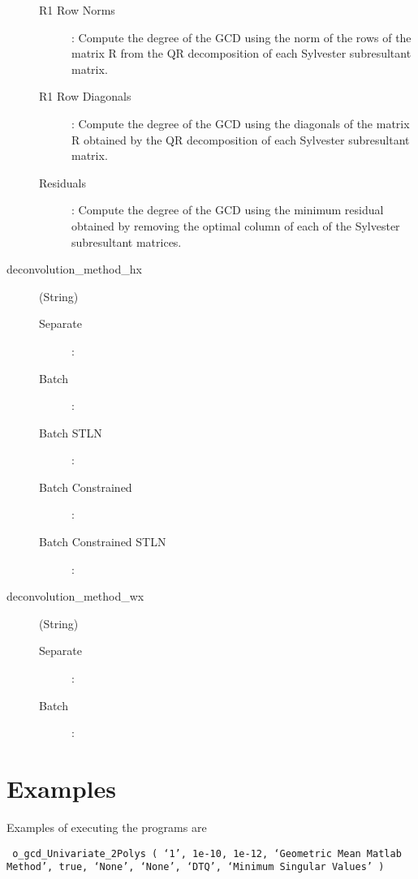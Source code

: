 \documentclass{article}
\begin{document}
\begin{description}
\begin{description}
			\item[R1 Row Norms] : Compute the degree of the GCD using the norm of the rows of the matrix R from the QR decomposition of each Sylvester subresultant matrix.
			
			\item[R1 Row Diagonals] : Compute the degree of the GCD using the diagonals of the matrix R obtained by the QR decomposition of each Sylvester subresultant matrix.
			
			\item[Residuals] : Compute the degree of the GCD using the minimum residual obtained by removing the optimal column of each of the Sylvester subresultant matrices.
		\end{description}
		
		
		
	\item [deconvolution\_method\_hx] (String)
		\begin{description}
		
			\item[Separate] :
			
			\item[Batch] :
			
			\item[Batch STLN] :
			
			\item[Batch Constrained] :
			
			\item[Batch Constrained STLN] :
			
		\end{description}
	
	\item [deconvolution\_method\_wx] (String)
		\begin{description}
			\item[Separate] :
			
			\item[Batch]  :
		\end{description}

%
\end{description}

\section{Examples}

Examples of executing the programs  are
%

\texttt
	{
		o\_gcd\_Univariate\_2Polys
		(
			`1',
			1e-10, 
			1e-12, 
			`Geometric Mean Matlab Method', 
			true, 
			`None', 
			`None', 
			`DTQ',
			`Minimum Singular Values'
		)}
\end{document}
